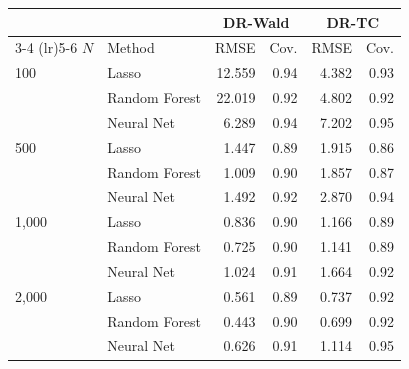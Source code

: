\begin{tabular}{llrrrr}
\toprule
 & & \multicolumn{2}{c}{DR-Wald} & \multicolumn{2}{c}{DR-TC} \\
\cmidrule(lr){3-4} \cmidrule(lr){5-6}
$N$ & Method & RMSE & Cov. & RMSE & Cov. \\
\midrule
100 & Lasso & 12.559 & 0.94 & 4.382 & 0.93 \\
 & Random Forest & 22.019 & 0.92 & 4.802 & 0.92 \\
 & Neural Net & 6.289 & 0.94 & 7.202 & 0.95 \\
\midrule
500 & Lasso & 1.447 & 0.89 & 1.915 & 0.86 \\
 & Random Forest & 1.009 & 0.90 & 1.857 & 0.87 \\
 & Neural Net & 1.492 & 0.92 & 2.870 & 0.94 \\
\midrule
1,000 & Lasso & 0.836 & 0.90 & 1.166 & 0.89 \\
 & Random Forest & 0.725 & 0.90 & 1.141 & 0.89 \\
 & Neural Net & 1.024 & 0.91 & 1.664 & 0.92 \\
\midrule
2,000 & Lasso & 0.561 & 0.89 & 0.737 & 0.92 \\
 & Random Forest & 0.443 & 0.90 & 0.699 & 0.92 \\
 & Neural Net & 0.626 & 0.91 & 1.114 & 0.95 \\
\bottomrule
\end{tabular}
